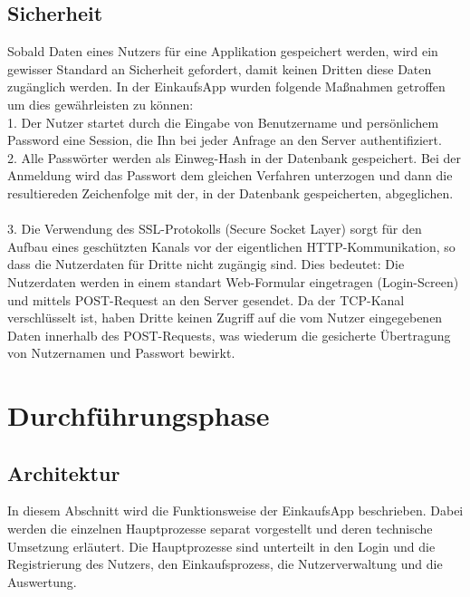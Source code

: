 \documentclass[12pt,a4paper]{article}
\begin{document}
\subsection{Sicherheit}
Sobald Daten eines Nutzers für eine Applikation gespeichert werden, wird ein gewisser Standard an Sicherheit gefordert, damit keinen Dritten diese Daten zugänglich werden.
In der EinkaufsApp wurden folgende Maßnahmen getroffen um dies gewährleisten zu können:
\\
1. Der Nutzer startet durch die Eingabe von Benutzername und persönlichem Password eine Session, die Ihn bei jeder Anfrage an den Server authentifiziert.
\\
2. Alle Passwörter werden als Einweg-Hash in der Datenbank gespeichert. Bei der Anmeldung wird das Passwort dem gleichen Verfahren unterzogen und dann die resultiereden Zeichenfolge mit der, in der Datenbank gespeicherten, abgeglichen.
\\ 
\\
3. Die Verwendung des SSL-Protokolls (Secure Socket Layer) sorgt für  den Aufbau eines geschützten Kanals vor der eigentlichen HTTP-Kommunikation, so dass die Nutzerdaten für Dritte nicht zugängig sind. 
Dies bedeutet: Die Nutzerdaten werden in einem standart Web-Formular eingetragen (Login-Screen) und mittels POST-Request an den Server gesendet. 
Da der TCP-Kanal verschlüsselt ist, haben Dritte keinen Zugriff auf die vom Nutzer eingegebenen Daten innerhalb des POST-Requests, was wiederum die gesicherte Übertragung von Nutzernamen und Passwort bewirkt.

\newpage
\section{Durchführungsphase}
\subsection*{Architektur}


In diesem Abschnitt wird die Funktionsweise der EinkaufsApp beschrieben. Dabei werden die einzelnen Hauptprozesse separat vorgestellt und deren technische Umsetzung erläutert. Die Hauptprozesse sind unterteilt in den Login und die Registrierung des Nutzers, den Einkaufsprozess, die Nutzerverwaltung und die Auswertung. 
\end{document}
